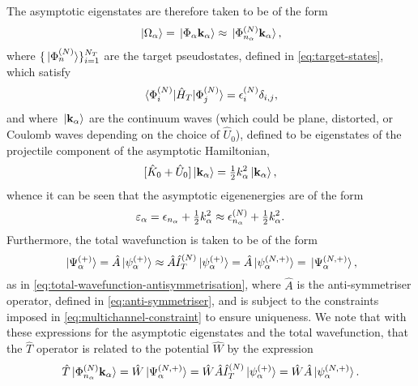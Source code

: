 \documentclass[]{article}
\begin{document}
The asymptotic eigenstates are therefore taken to be of the form
\begin{equation}
  \label{eq:ccc-asymptotic-states}
  \ket*{\Omega_{\alpha}}
  =
  \ket*{\Phi_{\alpha} \vb{k}_{\alpha}}
  \approx
  \ket*{\Phi_{n_{\alpha}}^{(N)} \vb{k}_{\alpha}}
  ,
\end{equation}
where $\lbrace\ket*{\Phi_{n}^{(N)}}\rbrace_{i = 1}^{N_{T}}$ are the target
pseudostates, defined in \eqref{eq:target-states}, which satisfy
\begin{equation}
  \label{eq:ccc-target}
  \mel*
  {\Phi_{i}^{(N)}}
  {\hat{H}_{T}}
  {\Phi_{j}^{(N)}}
  =
  \epsilon_{i}^{(N)}
  \delta_{i, j}
  ,
\end{equation}
and where $\ket*{\vb{k}_{\alpha}}$ are the continuum waves (which could be
plane, distorted, or Coulomb waves depending on the choice of $\hat{U}_{0}$),
defined to be eigenstates of the projectile component of the asymptotic
Hamiltonian,
\begin{equation}
  \label{eq:ccc-waves}
  [
    \hat{K}_{0}
    +
    \hat{U}_{0}
  ]
  \ket*{\vb{k}_{\alpha}}
  =
  \tfrac{1}{2}
  k_{\alpha}^{2}
  \ket*{\vb{k}_{\alpha}}
  ,
\end{equation}
whence it can be seen that the asymptotic eigenenergies are of the form
\begin{equation}
  \label{eq:ccc-asymptotic-energy}
  \varepsilon_{\alpha}
  =
  \epsilon_{n_{\alpha}}
  +
  \tfrac{1}{2}
  k_{\alpha}^{2}
  \approx
  \epsilon_{n_{\alpha}}^{(N)}
  +
  \tfrac{1}{2}
  k_{\alpha}^{2}
  .
\end{equation}
Furthermore, the total wavefunction is taken to be of the form
\begin{equation}
  \label{eq:ccc-total-wavefunction}
  \ket*{\Psi_{\alpha}^{(+)}}
  =
  \hat{A}
  \ket*{\psi_{\alpha}^{(+)}}
  \approx
  \hat{A}
  \hat{I}_{T}^{(N)}
  \ket*{\psi_{\alpha}^{(+)}}
  =
  \hat{A}
  \ket*{\psi_{\alpha}^{(N, +)}}
  =
  \ket*{\Psi_{\alpha}^{(N, +)}}
  ,
\end{equation}
as in \eqref{eq:total-wavefunction-antisymmetrisation}, where $\hat{A}$ is the
anti-symmetriser operator, defined in \eqref{eq:anti-symmetriser}, and is
subject to the constraints imposed in \eqref{eq:multichannel-constraint} to
ensure uniqueness.
We note that with these expressions for the asymptotic eigenstates and the total
wavefunction, that the $\hat{T}$ operator is related to the potential $\hat{W}$
by the expression
\begin{equation}
  \label{eq:ccc-t-w}
  \hat{T}
  \ket*{\Phi_{n_{\alpha}}^{(N)} \vb{k}_{\alpha}}
  =
  \hat{W}
  \ket*{\Psi_{\alpha}^{(N, +)}}
  =
  \hat{W}
  \hat{A}
  \hat{I}_{T}^{(N)}
  \ket*{\psi_{\alpha}^{(+)}}
  =
  \hat{W}
  \hat{A}
  \ket*{\psi_{\alpha}^{(N, +)}}
  .
\end{equation}
\end{document}
